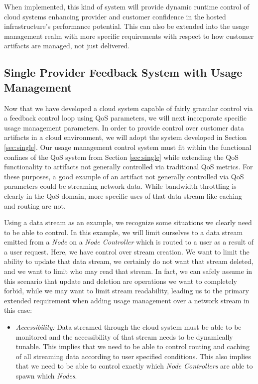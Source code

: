 \documentclass[notitlepage]{book}
\begin{document}
\begin{doublespace}
When implemented, this kind of system will provide dynamic runtime control of cloud systems enhancing provider and customer confidence in the hosted infrastructure's performance potential.  This can also be extended into the usage management realm with more specific requirements with respect to how customer artifacts are managed, not just delivered.

\subsection{Single Provider Feedback System with Usage Management}\label{sec:singleUm}
Now that we have developed a cloud system capable of fairly granular control via a feedback control loop using QoS parameters, we will next incorporate specific usage management parameters.  In order to provide control over customer data artifacts in a cloud environment, we will adopt the system developed in Section \ref{sec:single}.  Our usage management control system must fit within the functional confines of the QoS system from Section \ref{sec:single} while extending the QoS functionality to artifacts not generally controlled via traditional QoS metrics.  For these purposes, a good example of an artifact not generally controlled via QoS parameters could be streaming network data.  While bandwidth throttling is clearly in the QoS domain, more specific uses of that data stream like caching and routing are not.   

Using a data stream as an example, we recognize some situations we clearly need to be able to control.  In this example, we will limit ourselves to a data stream emitted from a \textit{Node} on a \textit{Node Controller} which is routed to a user as a result of a user request.  Here, we have control over stream creation.  We want to limit the ability to update that data stream, we certainly do not want that stream deleted, and we want to limit who may read that stream.  In fact, we can safely assume in this scenario that update and deletion are operations we want to completely forbid, while we may want to limit stream readability, leading us to the primary extended requirement when adding usage management over a network stream in this case:

\begin{itemize}
\item \textit{Accessibility:} Data streamed through the cloud system must be able to be monitored and the accessibility of that stream needs to be dynamically tunable.  This implies that we need to be able to control routing and caching of all streaming data according to user specified conditions.  This also implies that we need to be able to control exactly which \textit{Node Controllers} are able to spawn which \textit{Nodes}.
\end{itemize}


\end{doublespace}
\end{document}
